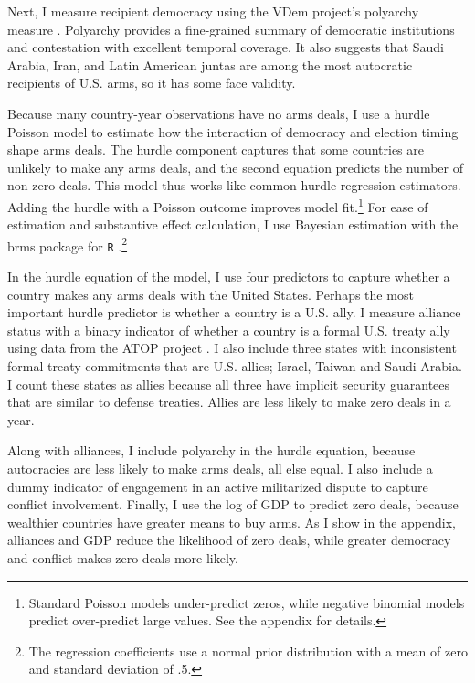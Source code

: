 \documentclass[12pt]{article}
\begin{document}
Next, I measure recipient democracy using the VDem project's polyarchy measure \citep{Coppedgeetal2008}. 
Polyarchy provides a fine-grained summary of democratic institutions and contestation with excellent temporal coverage.
It also suggests that Saudi Arabia, Iran, and Latin American juntas are among the most autocratic recipients of U.S. arms, so it has some face validity.  


Because many country-year observations have no arms deals, I use a hurdle Poisson model to estimate how the interaction of democracy and election timing shape arms deals.
The hurdle component captures that some countries are unlikely to make any arms deals, and the second equation predicts the number of non-zero deals.
This model thus works like common hurdle regression estimators.  
Adding the hurdle with a Poisson outcome improves model fit.\footnote{Standard Poisson models under-predict zeros, while negative binomial models predict over-predict large values. See the appendix for details.} 
For ease of estimation and substantive effect calculation, I use Bayesian estimation with the brms package for \texttt{R} \citep{Buerkner2017}.\footnote{The regression coefficients use a normal prior distribution with a mean of zero and standard deviation of .5.}


In the hurdle equation of the model, I use four predictors to capture whether a country makes any arms deals with the United States. 
Perhaps the most important hurdle predictor is whether a country is a U.S. ally. 
I measure alliance status with a binary indicator of whether a country is a formal U.S. treaty ally using data from the ATOP project \citep{Leedsetal2002}.
I also include three states with inconsistent formal treaty commitments that are U.S. allies; Israel, Taiwan and Saudi Arabia. 
I count these states as allies because all three have implicit security guarantees that are similar to defense treaties.
Allies are less likely to make zero deals in a year.  


Along with alliances, I include polyarchy in the hurdle equation, because autocracies are less likely to make arms deals, all else equal. 
I also include a dummy indicator of engagement in an active militarized dispute to capture conflict involvement. 
Finally, I use the log of GDP to predict zero deals, because wealthier countries have greater means to buy arms.
As I show in the appendix, alliances and GDP reduce the likelihood of zero deals, while greater democracy and conflict makes zero deals more likely. 
\end{document}
